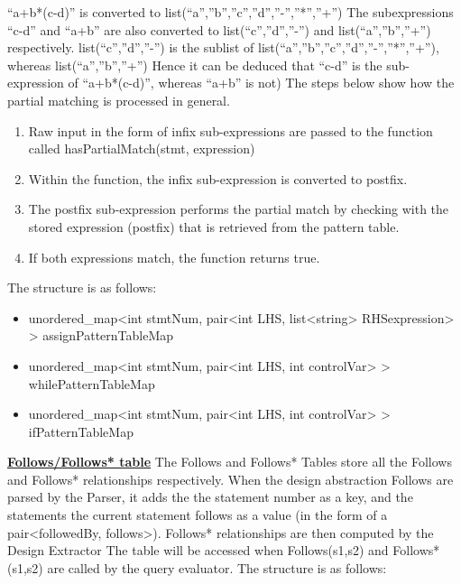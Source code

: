 \documentclass[12pt]{article}
\begin{document}
“a+b*(c-d)” is converted to list(“a”,”b”,”c”,”d”,”-”,”*”,”+”)
The subexpressions “c-d” and “a+b” are also converted to list(“c”,”d”,”-”) and list(“a”,”b”,”+”) respectively.
list(“c”,”d”,”-”) is the sublist of list(“a”,”b”,”c”,”d”,”-”,”*”,”+”), whereas list(“a”,”b”,”+”)
Hence it can be deduced that “c-d” is the sub-expression of “a+b*(c-d)”, whereas “a+b” is not) \newline The steps below show how the partial matching is processed in general.
\begin{enumerate}
\item Raw input in the form of infix sub-expressions are passed to the function called hasPartialMatch(stmt, expression)
\item Within the function, the infix sub-expression is converted to postfix.
\item The postfix sub-expression performs the partial match by checking with the stored expression (postfix) that is retrieved from the pattern table.
\item If both expressions match, the function returns true.
\end{enumerate}
The structure is as follows:
\begin{itemize}
\item unordered\_map<int stmtNum, pair<int LHS, list<string> RHSexpression> > assignPatternTableMap
\item unordered\_map<int stmtNum, pair<int LHS, int controlVar> > whilePatternTableMap
\item unordered\_map<int stmtNum, pair<int LHS, int controlVar> > ifPatternTableMap
\end{itemize}
\textbf{\underline{Follows/Follows* table}}
\newline The Follows and Follows* Tables store all the Follows and Follows* relationships respectively. When the design abstraction Follows are parsed by the Parser, it adds the the statement number as a key, and the statements the current statement follows as a value (in the form of a pair<followedBy, follows>). Follows* relationships are then computed by the Design Extractor The table will be accessed when Follows(s1,s2) and Follows*(s1,s2) are called by the query evaluator. The structure is as follows: \newline
\end{document}
